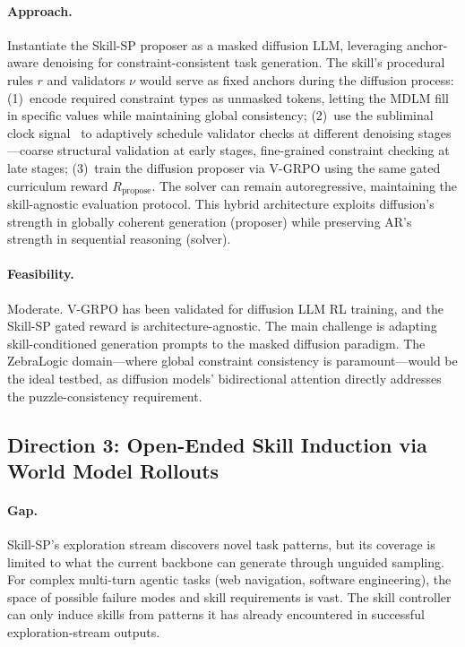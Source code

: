 \documentclass[11pt,a4paper]{article}
\begin{document}
\paragraph{Approach.}
Instantiate the Skill-SP proposer as a masked diffusion LLM, leveraging anchor-aware denoising for constraint-consistent task generation. The skill's procedural rules $r$ and validators $\nu$ would serve as fixed anchors during the diffusion process: (1)~encode required constraint types as unmasked tokens, letting the MDLM fill in specific values while maintaining global consistency; (2)~use the subliminal clock signal~\cite{rulli2026subliminal} to adaptively schedule validator checks at different denoising stages---coarse structural validation at early stages, fine-grained constraint checking at late stages; (3)~train the diffusion proposer via V-GRPO using the same gated curriculum reward $R_{\text{propose}}$. The solver can remain autoregressive, maintaining the skill-agnostic evaluation protocol. This hybrid architecture exploits diffusion's strength in globally coherent generation (proposer) while preserving AR's strength in sequential reasoning (solver).

\paragraph{Feasibility.}
Moderate. V-GRPO has been validated for diffusion LLM RL training, and the Skill-SP gated reward is architecture-agnostic. The main challenge is adapting skill-conditioned generation prompts to the masked diffusion paradigm. The ZebraLogic domain---where global constraint consistency is paramount---would be the ideal testbed, as diffusion models' bidirectional attention directly addresses the puzzle-consistency requirement.

\subsection{Direction 3: Open-Ended Skill Induction via World Model Rollouts}

\paragraph{Gap.}
Skill-SP's exploration stream discovers novel task patterns, but its coverage is limited to what the current backbone can generate through unguided sampling. For complex multi-turn agentic tasks (web navigation, software engineering), the space of possible failure modes and skill requirements is vast. The skill controller can only induce skills from patterns it has already encountered in successful exploration-stream outputs.
\end{document}

